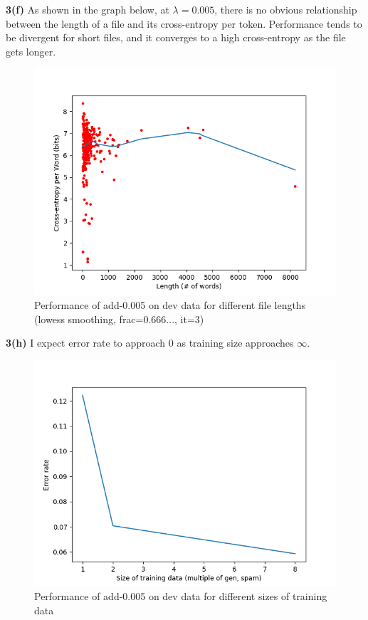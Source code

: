 \documentclass{article}
\begin{document}
\textbf{3(f)} As shown in the graph below, at $\lambda = 0.005$, there is no obvious relationship between the length of a file and its cross-entropy per token. Performance tends to be divergent for short files, and it converges to a high cross-entropy as the file gets longer. \\

\begin{figure}[!h]
	\caption{Performance of add-0.005 on dev data for different file lengths (lowess smoothing, frac=0.666..., it=3)}
	\centering
	\includegraphics[width=\textwidth]{3f}
\end{figure}

\textbf{3(h)} I expect error rate to approach $0$ as training size approaches $\infty$. \\

\begin{figure}[!h]
	\caption{Performance of add-0.005 on dev data for different sizes of training data}
	\centering
	\includegraphics[width=\textwidth]{3h}
\end{figure}
\end{document}
